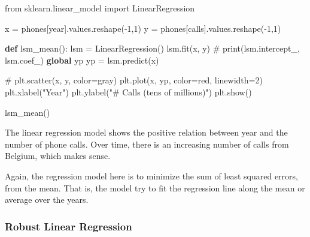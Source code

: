\documentclass[
  letterpaper,
]{scrbook}
\newenvironment{Shaded}{\begin{snugshade}}{\end{snugshade}}
\newcommand{\CommentTok}[1]{\textcolor[rgb]{0.37,0.37,0.37}{#1}}
\newcommand{\DecValTok}[1]{\textcolor[rgb]{0.68,0.00,0.00}{#1}}
\newcommand{\ImportTok}[1]{\textcolor[rgb]{0.00,0.46,0.62}{#1}}
\newcommand{\KeywordTok}[1]{\textcolor[rgb]{0.00,0.23,0.31}{\textbf{#1}}}
\newcommand{\NormalTok}[1]{\textcolor[rgb]{0.00,0.23,0.31}{#1}}
\newcommand{\OperatorTok}[1]{\textcolor[rgb]{0.37,0.37,0.37}{#1}}
\newcommand{\StringTok}[1]{\textcolor[rgb]{0.13,0.47,0.30}{#1}}
\begin{document}
\begin{Shaded}
\begin{Highlighting}[]
\ImportTok{from}\NormalTok{ sklearn.linear\_model }\ImportTok{import}\NormalTok{ LinearRegression}

\NormalTok{x }\OperatorTok{=}\NormalTok{ phones[}\StringTok{\textquotesingle{}year\textquotesingle{}}\NormalTok{].values.reshape(}\OperatorTok{{-}}\DecValTok{1}\NormalTok{,}\DecValTok{1}\NormalTok{)}
\NormalTok{y }\OperatorTok{=}\NormalTok{ phones[}\StringTok{\textquotesingle{}calls\textquotesingle{}}\NormalTok{].values.reshape(}\OperatorTok{{-}}\DecValTok{1}\NormalTok{,}\DecValTok{1}\NormalTok{)}

\KeywordTok{def}\NormalTok{ lsm\_mean():}
\NormalTok{    lsm }\OperatorTok{=}\NormalTok{ LinearRegression()}
\NormalTok{    lsm.fit(x, y)}
    \CommentTok{\# print(lsm.intercept\_, lsm.coef\_)}
    \KeywordTok{global}\NormalTok{ yp }
\NormalTok{    yp }\OperatorTok{=}\NormalTok{ lsm.predict(x)}

    \CommentTok{\# plt.scatter(x, y,  color=\textquotesingle{}gray\textquotesingle{})}
\NormalTok{    plt.plot(x, yp, color}\OperatorTok{=}\StringTok{\textquotesingle{}red\textquotesingle{}}\NormalTok{, linewidth}\OperatorTok{=}\DecValTok{2}\NormalTok{)}
\NormalTok{    plt.xlabel(}\StringTok{"Year"}\NormalTok{)}
\NormalTok{    plt.ylabel(}\StringTok{"\# Calls (tens of millions)"}\NormalTok{)}
\NormalTok{    plt.show()}
\end{Highlighting}
\end{Shaded}

\begin{Shaded}
\begin{Highlighting}[]
\NormalTok{lsm\_mean()}
\end{Highlighting}
\end{Shaded}

The linear regression model shows the positive relation between year and
the number of phone calls. Over time, there is an increasing number of
calls from Belgium, which makes sense.

Again, the regression model here is to minimize the sum of least squared
errors, from the mean. That is, the model try to fit the regression line
along the mean or average over the years.

\subsubsection*{Robust Linear
Regression}\label{robust-linear-regression}
\end{document}
